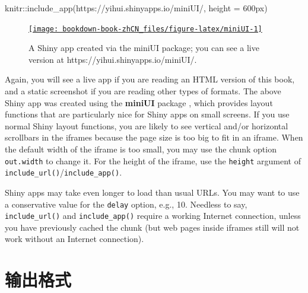 \documentclass[
  12pt,
]{krantz}
\newenvironment{Shaded}{\begin{snugshade}}{\end{snugshade}}
\newcommand{\AttributeTok}[1]{\textcolor[rgb]{0.77,0.63,0.00}{#1}}
\newcommand{\FunctionTok}[1]{\textcolor[rgb]{0.00,0.00,0.00}{#1}}
\newcommand{\NormalTok}[1]{#1}
\newcommand{\SpecialCharTok}[1]{\textcolor[rgb]{0.00,0.00,0.00}{#1}}
\newcommand{\StringTok}[1]{\textcolor[rgb]{0.31,0.60,0.02}{#1}}
\let\oldhref\href
\renewcommand{\href}[2]{#2\footnote{\url{#1}}}
\theoremstyle{definition}
\theoremstyle{definition}
\theoremstyle{definition}
\theoremstyle{definition}
\theoremstyle{remark}
\begin{document}
\let\ooldhref\href
\let\href\oldhref

\begin{Shaded}
\begin{Highlighting}[]
\NormalTok{knitr}\SpecialCharTok{::}\FunctionTok{include\_app}\NormalTok{(}\StringTok{\textquotesingle{}https://yihui.shinyapps.io/miniUI/\textquotesingle{}}\NormalTok{, }\AttributeTok{height =} \StringTok{\textquotesingle{}600px\textquotesingle{}}\NormalTok{)}
\end{Highlighting}
\end{Shaded}

\begin{figure}

{\centering \oldhref{https://yihui.shinyapps.io/miniUI/}{\texttt{[image: bookdown-book-zhCN\_files/figure-latex/miniUI-1]} }

}

\caption{A Shiny app created via the miniUI package; you can see a live version at https://yihui.shinyapps.io/miniUI/.}\label{fig:miniUI}
\end{figure}

\let\href\ooldhref

Again, you will see a live app if you are reading an HTML version of this book, and a static screenshot if you are reading other types of formats. The above Shiny app was created using the \textbf{miniUI} package \citep{R-miniUI}, which provides layout functions that are particularly nice for Shiny apps on small screens. If you use normal Shiny layout functions, you are likely to see vertical and/or horizontal scrollbars in the iframes because the page size is too big to fit in an iframe. When the default width of the iframe is too small, you may use the chunk option \texttt{out.width} to change it. For the height of the iframe, use the \texttt{height} argument of \texttt{include\_url()}/\texttt{include\_app()}.

Shiny apps may take even longer to load than usual URLs. You may want to use a conservative value for the \texttt{delay} option, e.g., 10. Needless to say, \texttt{include\_url()} and \texttt{include\_app()} require a working Internet connection, unless you have previously cached the chunk (but web pages inside iframes still will not work without an Internet connection).

\hypertarget{output-formats}{%
\chapter{输出格式}\label{output-formats}}
\end{document}

